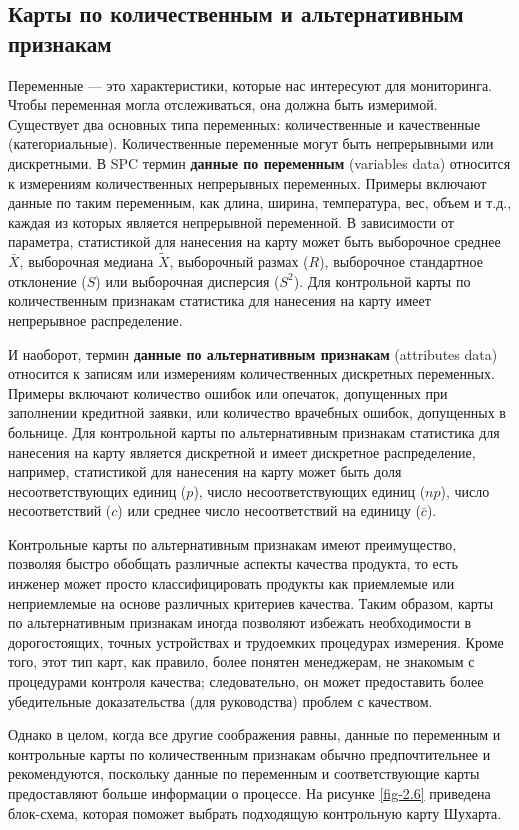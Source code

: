 \subsection{Карты по количественным и альтернативным признакам}
Переменные --- это характеристики, которые нас интересуют для мониторинга. Чтобы переменная могла отслеживаться, она должна быть измеримой. Существует два основных типа переменных: количественные и качественные (категориальные). Количественные переменные могут быть непрерывными или дискретными. В SPC термин \textbf{данные по переменным} (variables data) относится к измерениям количественных непрерывных переменных. Примеры включают данные по таким переменным, как длина, ширина, температура, вес, объем и т.д., каждая из которых является непрерывной переменной. В зависимости от параметра, статистикой для нанесения на карту может быть выборочное среднее \(\bar{X}\), выборочная медиана \(\tilde{X}\), выборочный размах (\(R\)), выборочное стандартное отклонение (\(S\)) или выборочная дисперсия (\(S^2\)). Для контрольной карты по количественным признакам статистика для нанесения на карту имеет непрерывное распределение.

И наоборот, термин \textbf{данные по альтернативным признакам} (attributes data) относится к записям или измерениям количественных дискретных переменных. Примеры включают количество ошибок или опечаток, допущенных при заполнении кредитной заявки, или количество врачебных ошибок, допущенных в больнице. Для контрольной карты по альтернативным признакам статистика для нанесения на карту является дискретной и имеет дискретное распределение, например, статистикой для нанесения на карту может быть доля несоответствующих единиц (\(p\)), число несоответствующих единиц (\(np\)), число несоответствий (\(c\)) или среднее число несоответствий на единицу (\(\bar{c}\)).

Контрольные карты по альтернативным признакам имеют преимущество, позволяя быстро обобщать различные аспекты качества продукта, то есть инженер может просто классифицировать продукты как приемлемые или неприемлемые на основе различных критериев качества. Таким образом, карты по альтернативным признакам иногда позволяют избежать необходимости в дорогостоящих, точных устройствах и трудоемких процедурах измерения. Кроме того, этот тип карт, как правило, более понятен менеджерам, не знакомым с процедурами контроля качества; следовательно, он может предоставить более убедительные доказательства (для руководства) проблем с качеством.

Однако в целом, когда все другие соображения равны, данные по переменным и контрольные карты по количественным признакам обычно предпочтительнее и рекомендуются, поскольку данные по переменным и соответствующие карты предоставляют больше информации о процессе. На рисунке \ref{fig-2.6} приведена блок-схема, которая поможет выбрать подходящую контрольную карту Шухарта.

